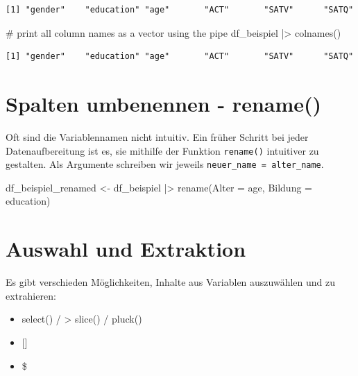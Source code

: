 \documentclass[
  letterpaper,
  DIV=11,
  numbers=noendperiod]{scrreprt}
\newenvironment{Shaded}{\begin{snugshade}}{\end{snugshade}}
\newcommand{\AttributeTok}[1]{\textcolor[rgb]{0.40,0.45,0.13}{#1}}
\newcommand{\CommentTok}[1]{\textcolor[rgb]{0.37,0.37,0.37}{#1}}
\newcommand{\FunctionTok}[1]{\textcolor[rgb]{0.28,0.35,0.67}{#1}}
\newcommand{\NormalTok}[1]{\textcolor[rgb]{0.00,0.23,0.31}{#1}}
\newcommand{\OtherTok}[1]{\textcolor[rgb]{0.00,0.23,0.31}{#1}}
\newcommand{\SpecialCharTok}[1]{\textcolor[rgb]{0.37,0.37,0.37}{#1}}
\providecommand{\tightlist}{%
  \setlength{\itemsep}{0pt}\setlength{\parskip}{0pt}}\usepackage{longtable,booktabs,array}
\begin{document}
\begin{verbatim}
[1] "gender"    "education" "age"       "ACT"       "SATV"      "SATQ"     
\end{verbatim}

\begin{Shaded}
\begin{Highlighting}[]
\CommentTok{\# print all column names as a vector using the pipe}
\NormalTok{df\_beispiel }\SpecialCharTok{|\textgreater{}} 
  \FunctionTok{colnames}\NormalTok{()}
\end{Highlighting}
\end{Shaded}

\begin{verbatim}
[1] "gender"    "education" "age"       "ACT"       "SATV"      "SATQ"     
\end{verbatim}

\section{Spalten umbenennen -
rename()}\label{spalten-umbenennen---rename}

Oft sind die Variablennamen nicht intuitiv. Ein früher Schritt bei jeder
Datenaufbereitung ist es, sie mithilfe der Funktion \texttt{rename()}
intuitiver zu gestalten. Als Argumente schreiben wir jeweils
\texttt{neuer\_name\ =\ alter\_name}.

\begin{Shaded}
\begin{Highlighting}[]
\NormalTok{df\_beispiel\_renamed }\OtherTok{\textless{}{-}}\NormalTok{ df\_beispiel }\SpecialCharTok{|\textgreater{}} 
  \FunctionTok{rename}\NormalTok{(}\AttributeTok{Alter =}\NormalTok{ age,}
         \AttributeTok{Bildung =}\NormalTok{ education) }
\end{Highlighting}
\end{Shaded}

\section{Auswahl und Extraktion}\label{auswahl-und-extraktion}

Es gibt verschieden Möglichkeiten, Inhalte aus Variablen auszuwählen und
zu extrahieren:

\begin{itemize}
\tightlist
\item
  select() / \textbar\textgreater{} slice() / pluck()
\item
  {[}{]}
\item
  \$
\end{itemize}
\end{document}
